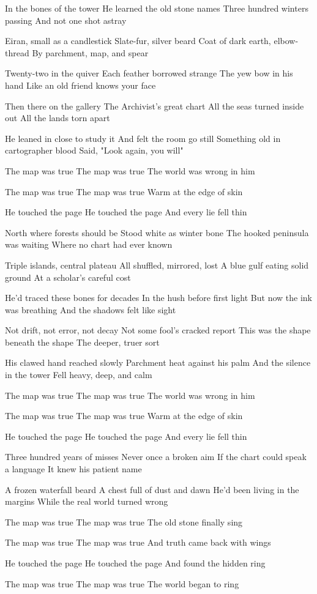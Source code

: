 \begin{lyrics}
In the bones of the tower
He learned the old stone names
Three hundred winters passing
And not one shot astray

Eiran, small as a candlestick
Slate-fur, silver beard
Coat of dark earth, elbow-thread
By parchment, map, and spear

Twenty-two in the quiver
Each feather borrowed strange
The yew bow in his hand
Like an old friend knows your face

Then there on the gallery
The Archivist's great chart
All the seas turned inside out
All the lands torn apart

He leaned in close to study it
And felt the room go still
Something old in cartographer blood
Said, "Look again, you will"

The map was true
The map was true
The world was wrong in him

The map was true
The map was true
Warm at the edge of skin

He touched the page
He touched the page
And every lie fell thin

North where forests should be
Stood white as winter bone
The hooked peninsula was waiting
Where no chart had ever known

Triple islands, central plateau
All shuffled, mirrored, lost
A blue gulf eating solid ground
At a scholar's careful cost

He'd traced these bones for decades
In the hush before first light
But now the ink was breathing
And the shadows felt like sight

Not drift, not error, not decay
Not some fool's cracked report
This was the shape beneath the shape
The deeper, truer sort

His clawed hand reached slowly
Parchment heat against his palm
And the silence in the tower
Fell heavy, deep, and calm

The map was true
The map was true
The world was wrong in him

The map was true
The map was true
Warm at the edge of skin

He touched the page
He touched the page
And every lie fell thin

Three hundred years of misses
Never once a broken aim
If the chart could speak a language
It knew his patient name

A frozen waterfall beard
A chest full of dust and dawn
He'd been living in the margins
While the real world turned wrong

The map was true
The map was true
The old stone finally sing

The map was true
The map was true
And truth came back with wings

He touched the page
He touched the page
And found the hidden ring

The map was true
The map was true
The world began to ring
\end{lyrics}

